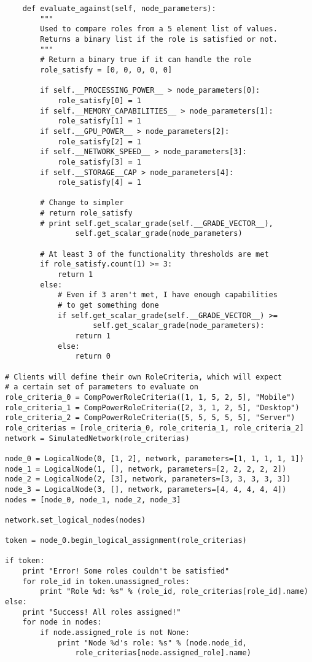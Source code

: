 \documentclass[11pt]{article}
\begin{document}
\begin{lstlisting}
    def evaluate_against(self, node_parameters):
        """
        Used to compare roles from a 5 element list of values.  
        Returns a binary list if the role is satisfied or not.  
        """
        # Return a binary true if it can handle the role
        role_satisfy = [0, 0, 0, 0, 0]
        
        if self.__PROCESSING_POWER__ > node_parameters[0]:
            role_satisfy[0] = 1
        if self.__MEMORY_CAPABILITIES__ > node_parameters[1]:
            role_satisfy[1] = 1
        if self.__GPU_POWER__ > node_parameters[2]:
            role_satisfy[2] = 1
        if self.__NETWORK_SPEED__ > node_parameters[3]:
            role_satisfy[3] = 1
        if self.__STORAGE__CAP > node_parameters[4]:
            role_satisfy[4] = 1
            
        # Change to simpler
        # return role_satisfy
        # print self.get_scalar_grade(self.__GRADE_VECTOR__),  
        		self.get_scalar_grade(node_parameters)
        
        # At least 3 of the functionality thresholds are met
        if role_satisfy.count(1) >= 3:
            return 1
        else:
            # Even if 3 aren't met, I have enough capabilities 
            # to get something done
            if self.get_scalar_grade(self.__GRADE_VECTOR__) >= 
            		self.get_scalar_grade(node_parameters):
                return 1
            else:
                return 0
                
# Clients will define their own RoleCriteria, which will expect
# a certain set of parameters to evaluate on
role_criteria_0 = CompPowerRoleCriteria([1, 1, 5, 2, 5], "Mobile")
role_criteria_1 = CompPowerRoleCriteria([2, 3, 1, 2, 5], "Desktop")
role_criteria_2 = CompPowerRoleCriteria([5, 5, 5, 5, 5], "Server")
role_criterias = [role_criteria_0, role_criteria_1, role_criteria_2]
network = SimulatedNetwork(role_criterias)        

node_0 = LogicalNode(0, [1, 2], network, parameters=[1, 1, 1, 1, 1])
node_1 = LogicalNode(1, [], network, parameters=[2, 2, 2, 2, 2])
node_2 = LogicalNode(2, [3], network, parameters=[3, 3, 3, 3, 3])
node_3 = LogicalNode(3, [], network, parameters=[4, 4, 4, 4, 4])
nodes = [node_0, node_1, node_2, node_3]

network.set_logical_nodes(nodes)

token = node_0.begin_logical_assignment(role_criterias)

if token:
    print "Error! Some roles couldn't be satisfied"
    for role_id in token.unassigned_roles:
        print "Role %d: %s" % (role_id, role_criterias[role_id].name)
else:
    print "Success! All roles assigned!"
    for node in nodes:
        if node.assigned_role is not None:
            print "Node %d's role: %s" % (node.node_id, 
            	role_criterias[node.assigned_role].name)
        
\end{lstlisting}
\end{document}
